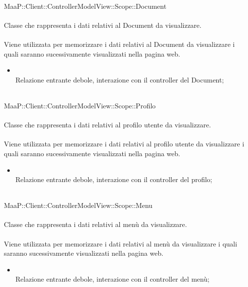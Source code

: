 \\
MaaP::Client::ControllerModelView::Scope::Document\\
\\
Classe che rappresenta i dati relativi al Document da visualizzare.\\
\\
Viene utilizzata per memorizzare i dati relativi al Document da visualizzare i quali saranno sucessivamente visualizzati nella pagina web.\\
\begin{itemize}
\item{}\\
Relazione entrante debole, interazione con il controller del Document;
\end{itemize}

\\
MaaP::Client::ControllerModelView::Scope::Profilo\\
\\
Classe che rappresenta i dati relativi al profilo utente da visualizzare.\\
\\
Viene utilizzata per memorizzare i dati relativi al profilo utente da visualizzare i quali saranno sucessivamente visualizzati nella pagina web.\\
\begin{itemize}
\item{}\\
Relazione entrante debole, interazione con il controller del profilo;
\end{itemize}

\\
MaaP::Client::ControllerModelView::Scope::Menu\\
\\
Classe che rappresenta i dati relativi al menù da visualizzare.\\
\\
Viene utilizzata per memorizzare i dati relativi al menù da visualizzare i quali saranno sucessivamente visualizzati nella pagina web.\\
\begin{itemize}
\item{}\\
Relazione entrante debole, interazione con il controller del menù;
\end{itemize}


